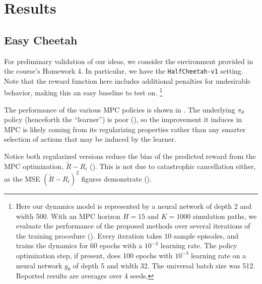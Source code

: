 \documentclass{article}
\let\Oldsection\section
\renewcommand{\section}{\FloatBarrier\Oldsection}
\let\Oldsubsection\subsection
\renewcommand{\subsection}{\FloatBarrier\Oldsubsection}
\begin{document}
\section{Results}


\subsection{Easy Cheetah}\label{sec:easy-cheetah}

For preliminary validation of our ideas, we consider the environment provided in the course's Homework 4. In particular, we have the \texttt{HalfCheetah-v1} setting. Note that the reward function here includes additional penalties for undesirable behavior, making this an easy baseline to test on. \footnote{Here our dynamics model is represented by a neural network of depth 2 and width 500. With an MPC horizon $H=15$ and $K=1000$ simulation paths, we evaluate the performance of the proposed methods over several iterations of the training procedure (). Every iteration takes 10 sample episodes, and trains the dynamics for 60 epochs with a $10^{-3}$ learning rate. The policy optimization step, if present, does 100 epochs with $10^{-3}$ learning rate on a neural network $g_\theta$ of depth 5 and width 32. The universal batch size was 512. Reported results are averages over 4 seeds.}

The performance of the various MPC policies is shown in . The underlying $\pi_\theta$ policy (henceforth the ``learner'') is poor (), so the improvement it induces in MPC is likely coming from its regularizing properties rather than any smarter selection of actions that may be induced by the learner.



Notice both regularized versions reduce the bias of the predicted reward from the MPC optimization, $\tilde R - R_i$ (). This is not due to catastrophic cancellation either, as the MSE $(\tilde R - R_i)^2$ figures demonstrate ().
\end{document}
